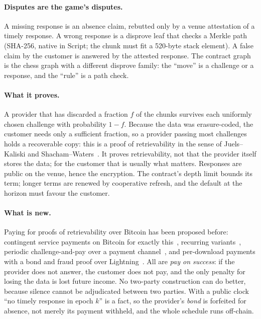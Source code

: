 \documentclass[11pt]{article}
\begin{document}
\paragraph{Disputes are the game's disputes.} A missing response is an
absence claim, rebutted only by a venue attestation of a timely response.
A wrong response is a disprove leaf that checks a Merkle path (SHA-256,
native in Script; the chunk must fit a 520-byte stack element). A false
claim by the customer is answered by the attested response. The
contract graph is the chess graph with a different disprove family: the
``move'' is a challenge or a response, and the ``rule'' is a path check.

\paragraph{What it proves.} A provider that has discarded a fraction
$f$ of the chunks survives each uniformly chosen challenge with
probability $1-f$. Because the data was erasure-coded, the customer
needs only a sufficient fraction, so a provider passing most challenges
holds a recoverable copy: this is a proof of retrievability in the sense
of Juels--Kaliski and Shacham--Waters~\cite{jk,sw}. It proves
retrievability, not that the provider itself stores the data; for the
customer that is usually what matters. Responses are public on the
venue, hence the encryption. The contract's depth limit bounds its
term; longer terms are renewed by cooperative refresh, and the default
at the horizon must favour the customer.

\paragraph{What is new.} Paying for proofs of retrievability over
Bitcoin has been proposed before: contingent service payments on
Bitcoin for exactly this~\cite{zkcsp}, recurring variants~\cite{rcpor},
periodic challenge-and-pay over a payment channel~\cite{scrypt}, and
per-download payments with a bond and fraud proof over
Lightning~\cite{bitstream}. All are \emph{pay on success}: if the
provider does not answer, the customer does not pay, and the only
penalty for losing the data is lost future income. No two-party
construction can do better, because silence cannot be adjudicated
between two parties. With a public clock ``no timely response in epoch
$k$'' is a fact, so the provider's \emph{bond} is forfeited for absence,
not merely its payment withheld, and the whole schedule runs off-chain.
\end{document}
